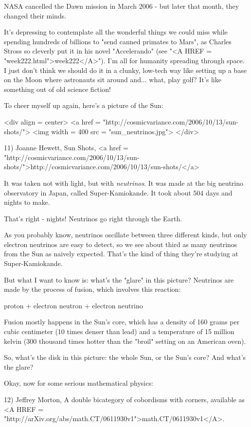 NASA cancelled the Dawn mission in March 2006 - but later that month,
they changed their minds.  

It's depressing to contemplate all the wonderful things we could miss
while spending hundreds of billions to "send canned primates to
Mars", as Charles Stross so cleverly put it in his novel
"Accelerando" (see "<A HREF = "week222.html">week222</A>").
I'm all for humanity spreading through space.  I just don't think we
should do it in a clunky, low-tech way like setting up a base on the
Moon where astronauts sit around and... what, play golf?  It's like
something out of old science fiction!

To cheer myself up again, here's a picture of the Sun:

<div align = center>
<a href = "http://cosmicvariance.com/2006/10/13/sun-shots/">
<img width = 400 src = "sun_neutrinos.jpg">
</div>

11) Joanne Hewett, Sun Shots, <a href = "http://cosmicvariance.com/2006/10/13/sun-shots/">http://cosmicvariance.com/2006/10/13/sun-shots/</a>

It was taken not with light, but with \emph{neutrinos}.  It was made at
the big neutrino observatory in Japan, called Super-Kamiokande.  It
took about 504 days and nights to make.  

That's right - nights! Neutrinos go right through the Earth.

As you probably know, neutrinos oscillate between three different 
kinds, but only electron neutrinos are easy to detect, so we see about
third as many neutrinos from the Sun as naively expected.  That's
the kind of thing they're studying at Super-Kamiokande.

But what I want to know is: what's the "glare" in this picture?  
Neutrinos are made by the process of fusion, which involves this 
reaction:

proton + electron \to  neutron + electron neutrino

Fusion mostly happens in the Sun's core, which has a density of 160 
grams per cubic centimeter (10 times denser than lead) and a temperature 
of 15 million kelvin (300 thousand times hotter than 
the "broil" setting on an American oven).  

So, what's the disk in this picture: the whole Sun, or the Sun's core?
And what's the glare?  

Okay, now for some serious mathematical physics:

12) Jeffrey Morton, A double bicategory of cobordisms with corners,
available as <A HREF = "http://arXiv.org/abs/math.CT/0611930v1">math.CT/0611930v1</A>. 

